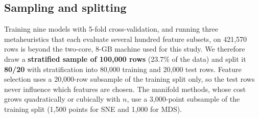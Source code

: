 \subsection{Sampling and splitting}
Training nine models with 5-fold cross-validation, and running three metaheuristics that each evaluate several hundred feature subsets, on 421{,}570 rows is beyond the two-core, 8-GB machine used for this study. We therefore draw a \textbf{stratified sample of 100{,}000 rows} (23.7\% of the data) and split it \textbf{80/20} with stratification into 80{,}000 training and 20{,}000 test rows. Feature selection uses a 20{,}000-row subsample of the training split only, so the test rows never influence which features are chosen. The manifold methods, whose cost grows quadratically or cubically with $n$, use a 3{,}000-point subsample of the training split (1{,}500 points for SNE and 1{,}000 for MDS).
